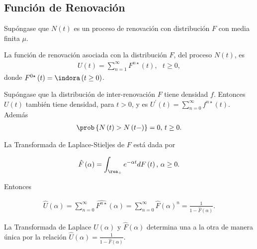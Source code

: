 %
\subsection{Funci\'on de Renovaci\'on}
%


Sup\'ongase que $N\left(t\right)$ es un proceso de renovaci\'on con distribuci\'on $F$ con media finita $\mu$.

\begin{Def}
La funci\'on de renovaci\'on asociada con la distribuci\'on $F$, del proceso $N\left(t\right)$, es
\begin{eqnarray*}
U\left(t\right)=\sum_{n=1}^{\infty}F^{n\star}\left(t\right),\textrm{   }t\geq0,
\end{eqnarray*}
donde $F^{0\star}\left(t\right)=\indora\left(t\geq0\right)$.
\end{Def}


\begin{Prop}
Sup\'ongase que la distribuci\'on de inter-renovaci\'on $F$ tiene densidad $f$. Entonces $U\left(t\right)$ tambi\'en tiene densidad, para $t>0$, y es $U^{'}\left(t\right)=\sum_{n=0}^{\infty}f^{n\star}\left(t\right)$. Adem\'as
\begin{eqnarray*}
\prob\left\{N\left(t\right)>N\left(t-\right)\right\}=0\textrm{,   }t\geq0.
\end{eqnarray*}
\end{Prop}

\begin{Def}
La Transformada de Laplace-Stieljes de $F$ est\'a dada por

\begin{eqnarray*}
\hat{F}\left(\alpha\right)=\int_{\rea_{+}}e^{-\alpha t}dF\left(t\right)\textrm{,  }\alpha\geq0.
\end{eqnarray*}
\end{Def}

Entonces

\begin{eqnarray*}
\hat{U}\left(\alpha\right)=\sum_{n=0}^{\infty}\hat{F^{n\star}}\left(\alpha\right)=\sum_{n=0}^{\infty}\hat{F}\left(\alpha\right)^{n}=\frac{1}{1-\hat{F}\left(\alpha\right)}.
\end{eqnarray*}


\begin{Prop}
La Transformada de Laplace $\hat{U}\left(\alpha\right)$ y $\hat{F}\left(\alpha\right)$ determina una a la otra de manera \'unica por la relaci\'on $\hat{U}\left(\alpha\right)=\frac{1}{1-\hat{F}\left(\alpha\right)}$.
\end{Prop}


